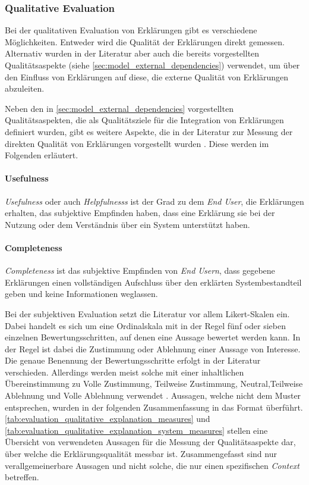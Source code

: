 \subsubsection{Qualitative Evaluation}

Bei der qualitativen Evaluation von Erklärungen gibt es verschiedene Möglichkeiten. Entweder wird die Qualität der Erklärungen direkt gemessen. Alternativ wurden in der Literatur aber auch die bereits vorgestellten Qualitätsaspekte (siehe \autoref{sec:model_external_dependencies}) verwendet, um über den Einfluss von Erklärungen auf diese, die externe Qualität von Erklärungen abzuleiten.

Neben den in \autoref{sec:model_external_dependencies} vorgestellten Qualitätsaspekten, die als Qualitätsziele für die Integration von Erklärungen definiert wurden, gibt es weitere Aspekte, die in der Literatur zur Messung der direkten Qualität von Erklärungen vorgestellt wurden \cite{sato_action-triggering_2019}. Diese werden im Folgenden erläutert.

\paragraph{Usefulness} \textit{Usefulness} oder auch \textit{Helpfulnesss} ist der Grad zu dem \textit{End User}, die Erklärungen erhalten, das subjektive Empfinden haben, dass eine Erklärung sie bei der Nutzung oder dem Verständnis über ein System unterstützt haben. 

\paragraph{Completeness} \textit{Completeness} ist das subjektive Empfinden von \textit{End Usern}, dass gegebene Erklärungen einen vollständigen Aufschluss über den erklärten Systembestandteil geben und keine Informationen weglassen.

\bigskip

Bei der subjektiven Evaluation setzt die Literatur vor allem Likert-Skalen ein. Dabei handelt es sich um eine Ordinalskala mit in der Regel fünf oder sieben einzelnen Bewertungsschritten, auf denen eine Aussage bewertet werden kann. In der Regel ist dabei die Zustimmung oder Ablehnung einer Aussage von Interesse. Die genaue Benennung der Bewertungsschritte erfolgt in der Literatur verschieden. Allerdings werden meist solche mit einer inhaltlichen Übereinstimmung zu \glqq Volle Zustimmung\grqq{}, \glqq Teilweise Zustimmung\grqq{}, \glqq Neutral\grqq{},\glqq Teilweise Ablehnung\grqq{} und \glqq Volle Ablehnung\grqq{} verwendet \cite{sato_action-triggering_2019, sato_context_nodate, wang_is_2018, hoffman_metrics_nodate, koo_understanding_2016, koo_why_2015, hernandez-bocanegra_effects_2020}. Aussagen, welche nicht dem Muster entsprechen, wurden in der folgenden Zusammenfassung in das Format überführt. \autoref{tab:evaluation_qualitative_explanation_measures} und \autoref{tab:evaluation_qualitative_explanation_system_measures} stellen eine Übersicht von verwendeten Aussagen für die Messung der Qualitätsaspekte dar, über welche die Erklärungsqualität messbar ist. Zusammengefasst sind nur verallgemeinerbare Aussagen und nicht solche, die nur einen spezifischen \textit{Context} betreffen.

